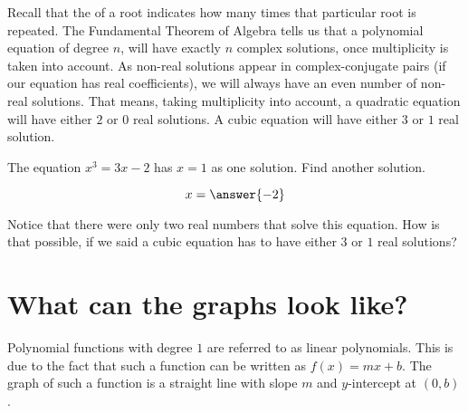\documentclass{ximera}
\begin{document}
Recall that the  of a root indicates how many times that particular root is repeated.
The Fundamental Theorem of Algebra tells us that a polynomial equation of degree $n$, will have exactly $n$ complex solutions, once multiplicity
is taken into account.  As non-real solutions appear in complex-conjugate pairs  (if our equation has real coefficients), we will always have an even number of non-real
solutions.  That means, taking multiplicity into account, a quadratic equation will have either $2$ or $0$ real solutions.  A cubic equation will have either $3$ or $1$ real
solution.


\begin{problem}

	The equation $x^3 = 3x-2$ has $x=1$ as one solution.  Find another solution.
	
	\begin{prompt}
		\[ x= \answer{-2} \]
	\end{prompt}
	\begin{feedback}
  		Notice that there were only two real numbers that solve this equation.  How is that possible, if we said a cubic equation has to have either
		$3$ or $1$ real solutions?
  	\end{feedback}
\end{problem}









\section{What can the graphs look like?}
Polynomial functions with degree $1$ are referred to as linear polynomials.  This is due to the fact
that such a function can be written as $f(x) = mx + b$.  The graph of such a function is a straight line
with slope $m$ and $y$-intercept at $(0,b)$.
\end{document}
